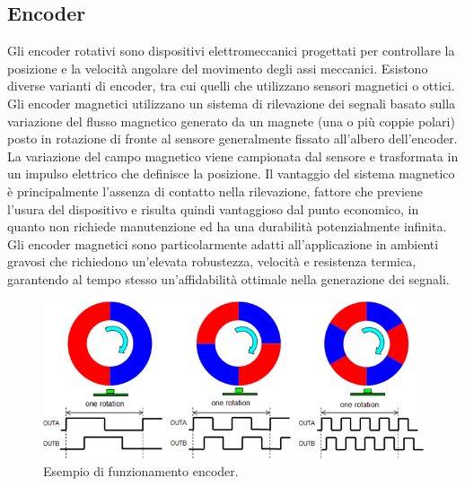 \documentclass{article}
\begin{document}
\subsection{Encoder}
Gli encoder rotativi sono dispositivi elettromeccanici progettati per controllare la posizione e la velocità angolare del movimento
degli assi meccanici.
Esistono diverse varianti di encoder, tra cui quelli che utilizzano sensori magnetici o ottici.
Gli encoder magnetici utilizzano un sistema di rilevazione dei segnali basato sulla variazione del flusso magnetico generato da
un magnete (una o più coppie polari) posto in rotazione di fronte al sensore generalmente fissato all’albero dell’encoder. La
variazione del campo magnetico viene campionata dal sensore e trasformata in un impulso elettrico che definisce la posizione.
Il vantaggio del sistema magnetico è principalmente l’assenza di contatto nella rilevazione, fattore che previene l’usura del
dispositivo e risulta quindi vantaggioso dal punto economico, in quanto non richiede manutenzione ed ha una durabilità
potenzialmente infinita.
Gli encoder magnetici sono particolarmente adatti all’applicazione in ambienti gravosi che richiedono
un’elevata robustezza, velocità e resistenza termica, garantendo al tempo stesso un’affidabilità ottimale nella generazione dei
segnali.
\begin{figure}[H]
\centering
\includegraphics[width=0.82\linewidth]{image/encoder.png}
\caption{\label{encoder:pot} Esempio di funzionamento encoder.}
\end{figure}
\end{document}
